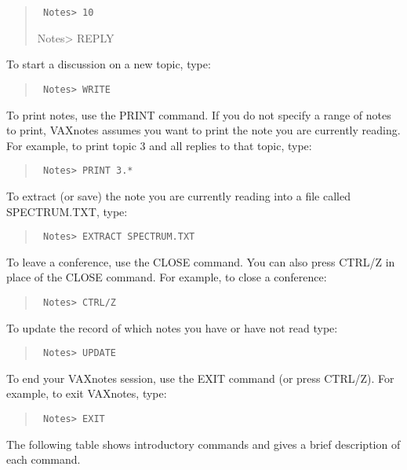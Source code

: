 \begin{quote}\tt
     Notes> 10

     Notes> REPLY
\end{quote}

To start a discussion on a new topic, type:

\begin{quote}\tt
Notes> WRITE
\end{quote}

To print notes, use the PRINT command.  If you do not specify a range of
notes to print, VAXnotes assumes you want to print the note you are
currently reading.  For example, to print topic 3 and all replies to that
topic, type:

\begin{quote}\tt
Notes> PRINT 3.*
\end{quote}

To extract (or save) the note you are currently reading
into a file called SPECTRUM.TXT, type:

\begin{quote}\tt
Notes> EXTRACT SPECTRUM.TXT
\end{quote}

To leave a conference, use the CLOSE command.  You can also press CTRL/Z
in place of the CLOSE command.  For example, to close a conference:

\begin{quote}\tt
Notes> CTRL/Z
\end{quote}

To update the record of which notes you have or have not read type:

\begin{quote}\tt
Notes> UPDATE
\end {quote}

To end your VAXnotes session, use the EXIT command (or press CTRL/Z).
For example, to exit VAXnotes, type:

\begin{quote}\tt
Notes> EXIT
\end{quote}

The following table shows introductory commands and gives a brief
description of each command.

